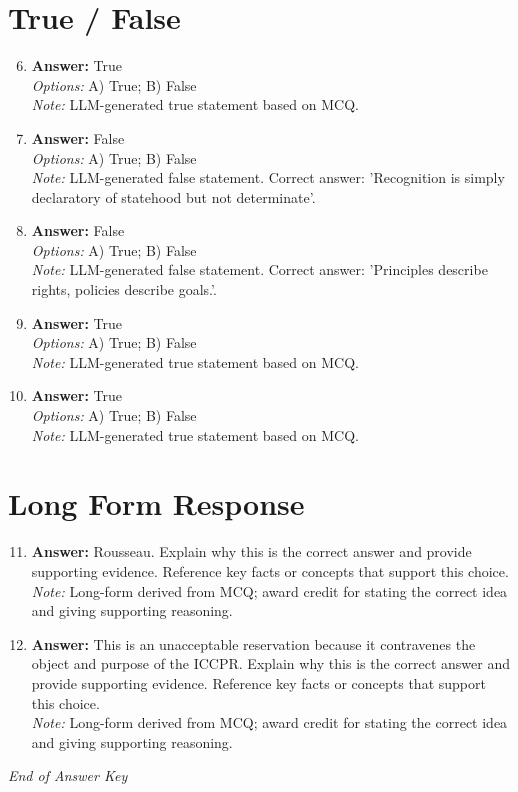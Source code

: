 \documentclass[12pt]{article}
\begin{document}
\section*{True / False}
\begin{enumerate}[label=\arabic*.]
\setcounter{enumi}{5}
\item \textbf{Answer:} True
\\ \textit{Options:} A) True; B) False
\\ \textit{Note:} LLM-generated true statement based on MCQ.
\item \textbf{Answer:} False
\\ \textit{Options:} A) True; B) False
\\ \textit{Note:} LLM-generated false statement. Correct answer: 'Recognition is simply declaratory of statehood but not determinate'.
\item \textbf{Answer:} False
\\ \textit{Options:} A) True; B) False
\\ \textit{Note:} LLM-generated false statement. Correct answer: 'Principles describe rights, policies describe goals.'.
\item \textbf{Answer:} True
\\ \textit{Options:} A) True; B) False
\\ \textit{Note:} LLM-generated true statement based on MCQ.
\item \textbf{Answer:} True
\\ \textit{Options:} A) True; B) False
\\ \textit{Note:} LLM-generated true statement based on MCQ.
\end{enumerate}

\section*{Long Form Response}
\begin{enumerate}[label=\arabic*.]
\setcounter{enumi}{10}
\item \textbf{Answer:} Rousseau. Explain why this is the correct answer and provide supporting evidence. Reference key facts or concepts that support this choice.
\\ \textit{Note:} Long-form derived from MCQ; award credit for stating the correct idea and giving supporting reasoning.
\item \textbf{Answer:} This is an unacceptable reservation because it contravenes the object and purpose of the ICCPR. Explain why this is the correct answer and provide supporting evidence. Reference key facts or concepts that support this choice.
\\ \textit{Note:} Long-form derived from MCQ; award credit for stating the correct idea and giving supporting reasoning.
\end{enumerate}

\vfill
\noindent\textit{End of Answer Key}
\end{document}
